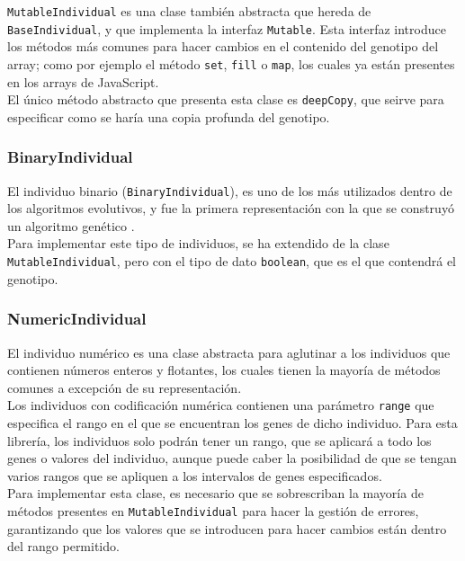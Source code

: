 \texttt{MutableIndividual} es una clase también abstracta que hereda de \texttt{BaseIndividual}, y que implementa la interfaz \texttt{Mutable}. Esta interfaz introduce los métodos más comunes para hacer cambios en el contenido del genotipo del array; como por ejemplo el método \texttt{set}, \texttt{fill} o \texttt{map}, los cuales ya están presentes en los arrays de JavaScript. \\

El único método abstracto que presenta esta clase es \texttt{deepCopy}, que seirve para especificar como se haría una copia profunda del genotipo.

\subsubsection{BinaryIndividual}

El individuo binario (\texttt{BinaryIndividual}), es uno de los más utilizados dentro de los algoritmos evolutivos, y fue la primera representación con la que se construyó un algoritmo genético \cite{holland1992adaptation}. \\

Para implementar este tipo de individuos, se ha extendido de la clase \texttt{MutableIndividual}, pero con el tipo de dato \texttt{boolean}, que es el que contendrá el genotipo.

\subsubsection{NumericIndividual}

El individuo numérico es una clase abstracta para aglutinar a los individuos que contienen números enteros y flotantes, los cuales tienen la mayoría de métodos comunes a excepción de su representación. \\

Los individuos con codificación numérica contienen una parámetro \texttt{range} que especifica el rango en el que se encuentran los genes de dicho individuo. Para esta librería, los individuos solo podrán tener un rango, que se aplicará a todo los genes o valores del individuo, aunque puede caber la posibilidad de que se tengan varios rangos que se apliquen a los intervalos de genes especificados. \\

Para implementar esta clase, es necesario que se sobrescriban la mayoría de métodos presentes en \texttt{MutableIndividual} para hacer la gestión de errores, garantizando que los valores que se introducen para hacer cambios están dentro del rango permitido.


